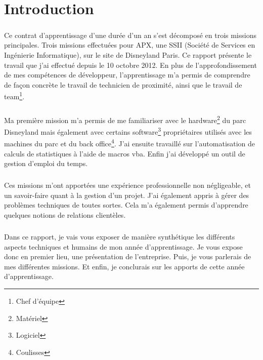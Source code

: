 \chapter*{Introduction}

\paragraph{}
Ce contrat d'apprentissage d'une durée d'un an s'est décomposé en trois missions principales. Trois missions effectuées pour APX, une SSII (Société de Services en Ingénierie Informatique), sur le site de Disneyland Paris.
Ce rapport présente le travail que j'ai effectué depuis le 10 octobre 2012. 
En plus de l'approfondissement de mes compétences de développeur, l'apprentissage m'a permis de comprendre de façon concrète le travail de technicien de proximité, ainsi que le travail de \foreignlanguage{english}{\gls{team}\footnote{Chef d'équipe}}. 

\paragraph{}
Ma première mission m'a permis de me familiariser avec le \foreignlanguage{english}{\gls{hardware}}\footnote{Matériel} du parc Disneyland mais également avec certains \foreignlanguage{english}{\gls{software}}\footnote{Logiciel} propriétaires utilisés avec les machines du parc et du \foreignlanguage{english}{\gls{back office}}\footnote{Coulisses\label{backOffice}}. J'ai ensuite travaillé sur l'automatisation de calculs de statistiques à l'aide de macros \gls{vba}. Enfin j'ai développé un outil de gestion d'emploi du temps.
\paragraph{}
Ces missions m'ont apportées une expérience professionnelle non négligeable, et un savoir-faire quant à la gestion d'un projet.
J'ai également appris à gérer des problèmes techniques de toutes sortes. Cela m'a également permis d'apprendre quelques notions de relations clientèles.
\paragraph{}
Dans ce rapport, je vais vous exposer de manière synthétique les différents aspects techniques et humains de mon année d'apprentissage. Je vous expose donc en premier lieu, une présentation de l'entreprise. Puis, je vous parlerais de mes différentes missions. Et enfin, je conclurais sur les apports de cette année d'apprentissage. 
